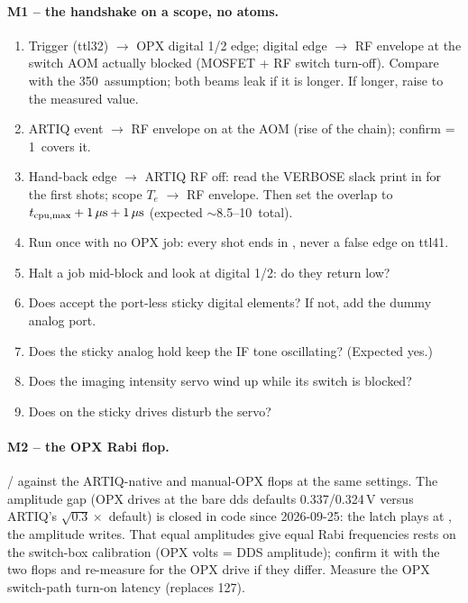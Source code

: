 \paragraph{M1 -- the handshake on a scope, no atoms.}
\begin{enumerate}[nosep]
  \item Trigger (ttl32) $\to$ OPX digital 1/2 edge; digital edge $\to$ RF
    envelope at the switch AOM actually blocked (MOSFET + RF switch
    turn-off). Compare with the 350\nsu\ assumption; both beams leak if it is
    longer. If longer, raise  to the
    measured value.
  \item ARTIQ  event $\to$ RF envelope on at the AOM (rise of the
    chain); confirm  = 1\us\ covers it.
  \item Hand-back edge $\to$ ARTIQ RF off: read the VERBOSE slack print in
     for the first shots; scope
    $T_e$ $\to$ RF envelope. Then set the overlap to $t_{\rm cpu,max} + 1\,\mu\mathrm{s} +
    1\,\mu\mathrm{s}$ (expected $\sim$8.5--10\us\ total).
  \item Run once with no OPX job: every shot ends in ,
    never a false edge on ttl41.
  \item Halt a job mid-block and look at digital 1/2: do they return low?
  \item Does  accept the port-less sticky digital elements?
    If not, add the dummy analog port.
  \item Does the sticky analog hold keep the IF tone oscillating? (Expected
    yes.)
  \item Does the imaging intensity servo wind up while its switch is
    blocked?
  \item Does  on the sticky drives disturb the servo?
\end{enumerate}

\paragraph{M2 -- the OPX Rabi flop.}  /
 against the ARTIQ-native and
manual-OPX flops at the same settings. The amplitude gap (OPX drives at the
bare dds defaults 0.337/0.324\,V versus ARTIQ's $\sqrt{0.3}\times$ default)
is closed in code since 2026-09-25: the latch plays at
, the
amplitude  writes. That equal amplitudes give equal
Rabi frequencies rests on the switch-box calibration (OPX volts = DDS
amplitude); confirm it with the two flops and re-measure
 for the OPX drive if they differ. Measure
the OPX switch-path turn-on latency (replaces 127\nsu).

